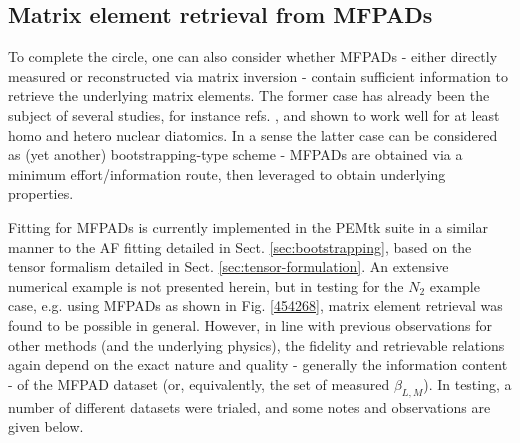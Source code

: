 \subsection{Matrix element retrieval from MFPADs\label{sec:recon-from-MFPADs}}

To complete the circle, one can also consider whether MFPADs - either directly measured or reconstructed via matrix inversion - contain sufficient information to retrieve the underlying matrix elements.  The former case has already been the subject of several studies, for instance refs. \cite{Gessner2002a,Lebech2003,Cherepkov2005, Yagishita2005}, and shown to work well for at least homo and hetero nuclear diatomics. In a sense the latter case can be considered as (yet another) bootstrapping-type scheme - MFPADs are obtained via a minimum effort/information route, then leveraged to obtain underlying properties. 

Fitting for MFPADs is currently implemented in the PEMtk suite in a similar manner to the AF fitting detailed in Sect. \ref{sec:bootstrapping}, based on the tensor formalism detailed in Sect. \ref{sec:tensor-formulation}. An extensive numerical example is not presented herein, but in testing for the $N_{2}$ example case, e.g. using MFPADs as shown in Fig. \ref{454268}, matrix element retrieval was found to be possible in general. However, in line with previous observations for other methods (and the underlying physics), the fidelity and retrievable relations again depend on the exact nature and quality - generally the information content - of the MFPAD dataset (or, equivalently, the set of measured $\beta_{L,M}$). In testing, a number of different datasets were trialed, and some notes and observations are given below.

